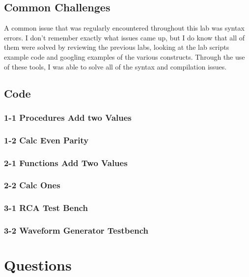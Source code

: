 \documentclass[a4paper, 12pt]{article}
\begin{document}
		\subsection{Common Challenges}
			A common issue that was regularly encountered throughout this lab was syntax errors. I don't remember exactly what issues came up, but I do know that all of them were solved by reviewing the previous labs, looking at the lab scripts example code and googling examples of the various constructs. Through the use of these tools, I was able to solve all of the syntax and compilation issues.

		\subsection{Code}
			\subsubsection{1-1 Procedures Add two Values}
				
			\subsubsection{1-2 Calc Even Parity}
				
			\subsubsection{2-1 Functions Add Two Values}
				
			\subsubsection{2-2 Calc Ones}
				
			\subsubsection{3-1 RCA Test Bench}
				
			\subsubsection{3-2 Waveform Generator Testbench}
				




	\section{Questions}



\end{document}
